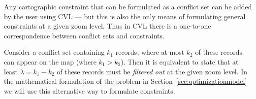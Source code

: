Any cartographic constraint that can be formulated as a conflict set can be added by the user using CVL --- but this is also the only means of formulating general constraints at a given zoom level. Thus in CVL there is a one-to-one correspondence between conflict sets and constraints. 



Consider a conflict set containing $k_1$ records, where at most $k_2$ of these records can appear on the map (where $k_1 > k_2$). Then it is equivalent to state that at least $\lambda = k_1 - k_2$ of these records must be \emph{filtered out} at the given zoom level. In the mathematical formulation of the problem in Section~\ref{sec:optimizationmodel} we will use this alternative way to formulate constraints.



